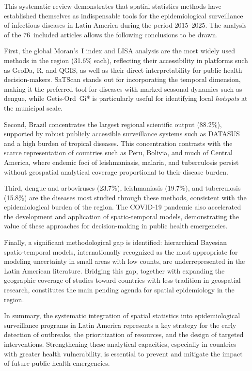 \documentclass[conference]{IEEEtran}
\begin{document}
This systematic review demonstrates that spatial statistics
methods have established themselves as indispensable tools
for the epidemiological surveillance of infectious diseases
in Latin America during the period 2015--2025. The analysis
of the 76~included articles allows the following conclusions
to be drawn.

First, the global Moran's~I index and LISA analysis are the
most widely used methods in the region (31.6\% each),
reflecting their accessibility in platforms such as GeoDa,
R, and QGIS, as well as their direct interpretability for
public health decision-makers. SaTScan stands out for
incorporating the temporal dimension, making it the
preferred tool for diseases with marked seasonal dynamics
such as dengue, while Getis-Ord~Gi* is particularly useful
for identifying local \textit{hotspots} at the municipal
scale.

Second, Brazil concentrates the largest regional scientific
output (88.2\%), supported by robust publicly accessible
surveillance systems such as DATASUS and a high burden of
tropical diseases. This concentration contrasts with the
scarce representation of countries such as Peru, Bolivia,
and much of Central America, where endemic foci of
leishmaniasis, malaria, and tuberculosis persist without
geospatial analytical coverage proportional to their disease
burden.

Third, dengue and arboviruses (23.7\%), leishmaniasis
(19.7\%), and tuberculosis (15.8\%) are the diseases most
studied through these methods, consistent with the
epidemiological burden of the region. The COVID-19 pandemic
also accelerated the development and application of
spatio-temporal models, demonstrating the value of these
approaches for decision-making in public health emergencies.

Finally, a significant methodological gap is identified:
hierarchical Bayesian spatio-temporal models, internationally
recognized as the most appropriate for modeling uncertainty
in small areas with low counts, are underrepresented in the
Latin American literature. Bridging this gap, together with
expanding the geographic coverage of studies toward countries
with less tradition in geospatial research, constitutes the
main pending agenda for spatial epidemiology in the region.

In summary, the systematic integration of spatial statistics
into epidemiological surveillance programs in Latin America
represents a key strategy for the early detection of
outbreaks, the prioritization of resources, and the design
of targeted interventions. Strengthening these analytical
capacities, especially in countries with greater health
vulnerability, is essential to prevent and mitigate the
impact of future public health emergencies.



\end{document}
